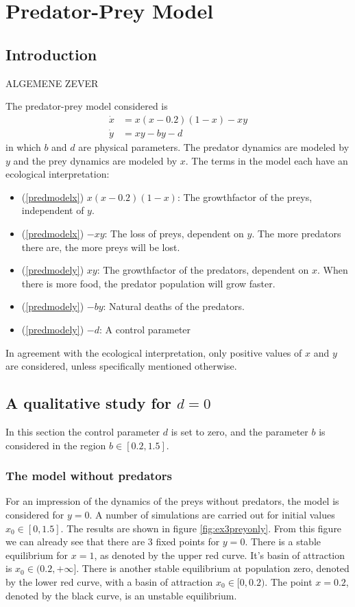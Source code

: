 \section{Predator-Prey Model}
\subsection{Introduction}
ALGEMENE ZEVER

The predator-prey model considered is
\begin{align}
\dot{x} &= x(x-0.2)(1-x) - xy \label{predmodelx} \\
\dot{y} &= xy-by-d \label{predmodely}
\end{align}
in which $b$ and $d$ are physical parameters. The predator dynamics are modeled by $y$ and the prey dynamics are modeled by $x$. The terms in the model each have an ecological interpretation:
\begin{itemize}
\item (\ref{predmodelx}) $x(x-0.2)(1-x)$: The growthfactor of the preys, independent of $y$.
\item (\ref{predmodelx}) $-xy$: The loss of preys, dependent on $y$. The more predators there are, the more preys will be lost.
\item (\ref{predmodely}) $xy$: The growthfactor of the predators, dependent on $x$. When there is more food, the predator population will grow faster.
\item (\ref{predmodely}) $-by$: Natural deaths of the predators.
\item (\ref{predmodely}) $-d$: A control parameter
\end{itemize}
In agreement with the ecological interpretation, only positive values of $x$ and $y$ are considered, unless specifically mentioned otherwise.

\subsection{A qualitative study for $d=0$}
In this section the control parameter $d$ is set to zero, and the parameter $b$ is considered in the region $b \in [0.2,1.5]$.
\subsubsection{The model without predators}
For an impression of the dynamics of the preys without predators, the model is considered for $y=0$. A number of simulations are carried out for initial values $x_0 \in [0,1.5]$. The results are shown in figure \ref{fig:ex3preyonly}. From this figure we can already see that there are 3 fixed points for $y=0$. There is a stable equilibrium for $x=1$, as denoted by the upper red curve. It's basin of attraction is $x_0 \in (0.2,+\infty]$. There is another stable equilibrium at population zero, denoted by the lower red curve, with a basin of attraction $x_0 \in [0, 0.2)$. The point $x=0.2$, denoted by the black curve, is an unstable equilibrium.

